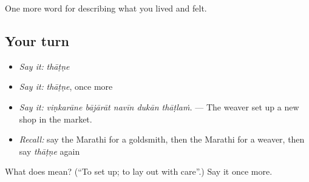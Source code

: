 \begin{grammarlens}[title={What you've built}]
One more word for describing what you lived and felt.
\end{grammarlens}

\subsection*{Your turn}
\begin{itemize}
\raggedright
  \item \emph{Say it:} \emph{thāṭṇe}
  \item \emph{Say it:} \emph{thāṭṇe}, once more
  \item \emph{Say it:} \emph{viṇkarāne bājārāt navīn dukān thāṭlaṁ.} — The weaver set up a new shop in the market.
  \item \emph{Recall:} say the Marathi for a goldsmith, then the Marathi for a weaver, then say \emph{thāṭṇe} again
\end{itemize}

\begin{tcolorbox}[breakable,colback=teal!4,colframe=teal!35!black,title={Before you move on}]
What does  mean? (\textquotedblleft{}To set up; to lay out with care\textquotedblright{}.) Say it once more.
\end{tcolorbox}
